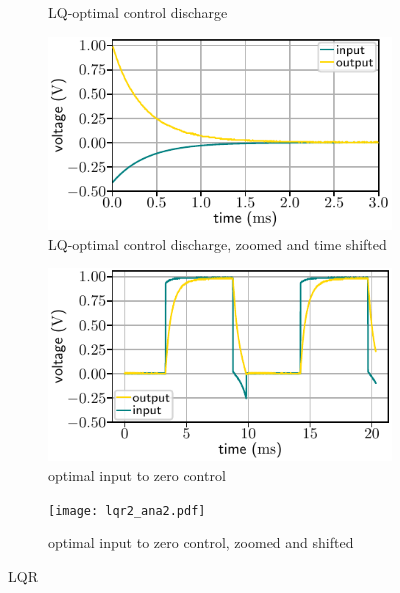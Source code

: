 \documentclass[10pt, a4paper]{article} %
\begin{document}
\begin{figure}
\begin{subfigure}{0.495\textwidth}
	     \caption{LQ-optimal control discharge}
     \end{subfigure}
	  \begin{subfigure}{0.495\textwidth}
	     \includegraphics[width=\textwidth]{lqr1_ana2.pdf}
		  \caption{LQ-optimal control discharge, zoomed and time shifted}
	  \end{subfigure}
\begin{subfigure}{0.495\textwidth}
	     \includegraphics[width=\textwidth]{lqr2_ana.pdf}
	     \caption{optimal input to zero control}
     \end{subfigure}
	  \begin{subfigure}{0.495\textwidth}
	     \texttt{[image: lqr2\_ana2.pdf]}
		  \caption{optimal input to zero control, zoomed and shifted}
     \end{subfigure}
	  \caption{LQR}
        \label{fig:LQR}
\end{figure}
\end{document}
